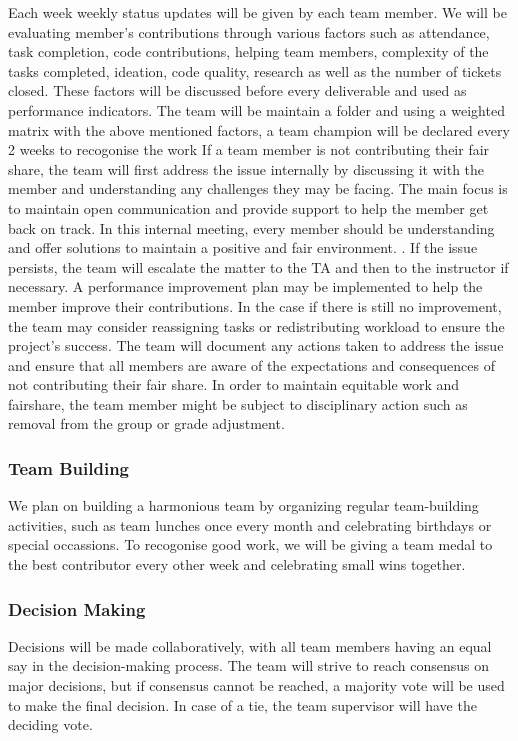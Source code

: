 \documentclass{article}
\begin{document}
\noindent Each week weekly status updates will be given by each team member. We will be evaluating member's contributions through various factors such as 
attendance, task completion, code contributions, helping team members, complexity of the tasks completed, ideation, code quality, research as well as the number of tickets closed. These
factors will be discussed before every deliverable and used as performance indicators. The team will be maintain a folder and using a weighted matrix with the above mentioned factors, a team champion will be declared every 2 weeks to recogonise the work
\noindent If a team member is not contributing their fair share, the team will first address the issue internally by discussing it with the member and understanding any challenges they may be facing.
The main focus is to maintain open communication and provide support to help the member get back on track. In this internal meeting, every member should be understanding and offer solutions to maintain a positive and fair environment.
. If the issue persists, the team will escalate the matter to the TA and then to the instructor if necessary. A performance improvement plan may be implemented to help the member improve their contributions. In the case if there is still no improvement,
the team may consider reassigning tasks or redistributing workload to ensure the project's success. The team will document any actions taken to address the issue and ensure that all members are aware of the expectations and consequences of not contributing their fair share.
In order to maintain equitable work and fairshare, the team member might be subject to disciplinary action such as removal from the group or grade adjustment.

\subsubsection*{Team Building}

We plan on building a harmonious team by organizing regular team-building activities, such as team lunches once every month and celebrating birthdays or special occassions. 
To recogonise good work, we will be giving a team medal to the best contributor every other week and celebrating small wins together. 

\subsubsection*{Decision Making} 

Decisions will be made collaboratively, with all team members having an equal say in the decision-making process. The team will strive to reach consensus on major decisions,
but if consensus cannot be reached, a majority vote will be used to make the final decision. In case of a tie, the team supervisor will have the deciding vote.
\end{document}
